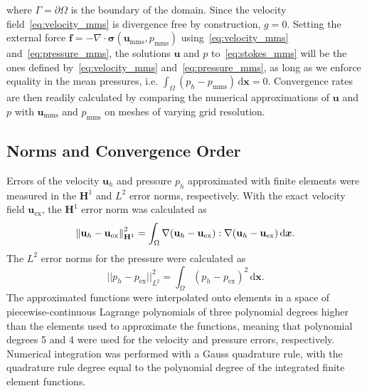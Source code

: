 \documentclass[fleqn]{wlscirep}
\newcommand{\normltwo}[1]{{ \vert\vert#1\vert\vert}_{L^2}}
\newcommand{\Hnorm}[1]{\norm{#1}_{\mathbf{H}^1}}
\newcommand{\intO}[1]{\int_{\Omega}#1 \, \mathrm d\bm{x}}
\newcommand{\ff}{\mathbf{f}}
\newcommand{\uu}{\mathbf{u}}
\newcommand{\bsig}{\bm{\sigma}}
\begin{document}
where $\Gamma=\partial\Omega$ is the boundary of the domain. Since the velocity field~\eqref{eq:velocity_mms} is divergence free by construction, $g = 0$. Setting the external force $\ff=-\nabla\cdot\bsig(\uu_{\mathrm{mms}}, p_{\mathrm{mms}})$  using~\eqref{eq:velocity_mms} and~\eqref{eq:pressure_mms}, the solutions $\uu$ and $p$ to~\eqref{eq:stokes_mms} will be the ones defined by~\eqref{eq:velocity_mms} and~\eqref{eq:pressure_mms}, as long as we enforce equality in the mean pressures, i.e. $\intO{(p_h - p_{\mathrm{mms}})}=0$. Convergence rates are then readily calculated by comparing the numerical approximations of $\uu$ and $p$ with $\uu_{\mathrm{mms}}$ and $p_{\mathrm{mms}}$ on meshes of varying grid resolution.

\subsection{Norms and Convergence Order}\label{subsec:norms_and_eoc}
Errors of the velocity $\uu_h$ and pressure $p_h$ approximated with finite elements were measured in the $\mathbf{H}^1$ and $L^2$ error norms, respectively. With the exact velocity field $\uu_{\mathrm{ex}}$, the $\mathbf{H}^1$ error norm was calculated as
\begin{equation*}
    \Hnorm{\uu_h - \uu_{\mathrm{ex}}}^2 = \intO{\nabla(\uu_h - \uu_{\mathrm{ex}}) : \nabla(\uu_h - \uu_{\mathrm{ex}})}.
\end{equation*}
The $L^2$ error norms for the pressure were calculated as
\begin{equation*}
    \normltwo{p_h - p_{\mathrm{ex}}}^2 = \intO{(p_h - p_{\mathrm{ex}})^2}.
\end{equation*}
The approximated functions were interpolated onto elements in a space of piecewise-continuous Lagrange polynomials of three polynomial degrees higher than the elements used to approximate the functions, meaning that polynomial degrees 5 and 4 were used for the velocity and pressure errors, respectively. Numerical integration was performed with a Gauss quadrature rule, with the quadrature rule degree equal to the polynomial degree of the integrated finite element functions. 
\end{document}
